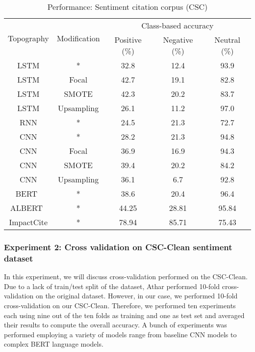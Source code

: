 \documentclass[runningheads]{llncs}
\begin{document}
\begin{table}[!t]
\renewcommand{\arraystretch}{1.3}
\caption{Performance: Sentiment citation corpus (CSC)}
\label{tab:sentiment_scc}
\centering
\begin{tabular}{|c|c|c|c|c|}\hline
\multirow{2}{*}{Topography} & \multirow{2}{*}{Modification} & \multicolumn{3}{c|}{Class-based accuracy} \\
\cline{3-5}
& & Positive (\%) & Negative (\%) & Neutral (\%) \\ \hline
LSTM & * & 32.8 & 12.4 & 93.9 \\ \hline
LSTM & Focal & 42.7 & 19.1 & 82.8 \\ \hline
LSTM & SMOTE & 42.3 & 20.2 & 83.7 \\ \hline
LSTM & Upsampling & 26.1 & 11.2 & 97.0 \\ \hline
\hline
RNN & * & 24.5 & 21.3 & 72.7 \\ \hline
\hline
CNN & * & 28.2 & 21.3 & 94.8 \\ \hline
CNN & Focal & 36.9 & 16.9 & 94.3 \\ \hline
CNN & SMOTE & 39.4 & 20.2 & 84.2 \\ \hline
CNN & Upsampling & 36.1 & 6.7 & 92.8 \\ \hline
\hline
BERT~\cite{devlin2018bert} & * & 38.6 & 20.4 & 96.4 \\ \hline
ALBERT~\cite{lan2019albert} & * & 44.25 & 28.81 & 95.84 \\ \hline
ImpactCite & * & 78.94 & 85.71 & 75.43 \\ \hline
\end{tabular}
\end{table}

\subsubsection{Experiment 2: Cross validation on CSC-Clean sentiment dataset}
In this experiment, we will discuss cross-validation performed on the CSC-Clean. Due to a lack of train/test split of the dataset, Athar \cite{athar:2011:SS} performed 10-fold cross-validation on the original dataset. However, in our case, we performed 10-fold cross-validation on our CSC-Clean. Therefore, we performed ten experiments each using nine out of the ten folds as training and one as test set and averaged their results to compute the overall accuracy. A bunch of experiments was performed employing a variety of models range from baseline CNN models to complex BERT language models.
\end{document}
